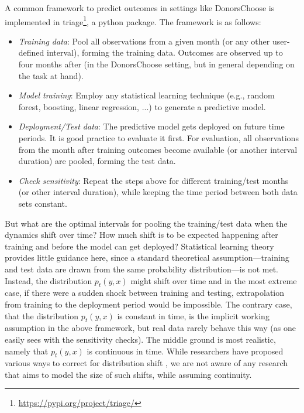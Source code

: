 \documentclass{article}
\begin{document}
A common framework to predict outcomes in settings like DonorsChoose is implemented in triage\footnote{\url{https://pypi.org/project/triage/}}, a python package. The framework is as follows: 
\begin{itemize}
    \item \textit{Training data}: Pool all observations from a given month (or any other user-defined interval), forming the training data. Outcomes are observed up to four months after (in the DonorsChoose setting, but in general depending on the task at hand).
    \item \textit{Model training}: Employ any statistical learning technique (e.g., random forest, boosting, linear regression, ...) to generate a predictive model.
    \item \textit{Deployment/Test data}: The predictive model gets deployed on future time periods. It is good practice to evaluate it first. For evaluation, all observations from the month after training outcomes become available (or another interval duration) are pooled, forming the test data.
    \item \textit{Check sensitivity}: Repeat the steps above for different training/test months (or other interval duration), while keeping the time period between both data sets constant.
\end{itemize}
But what are the optimal intervals for pooling the training/test data when the dynamics shift over time? How much shift is to be expected happening after training and before the model can get deployed? Statistical learning theory provides little guidance here, since a standard theoretical assumption---training and test data are drawn from the same probability distribution---is not met. Instead, the distribution $p_t(y, x)$ might shift over time and in the most extreme case, if there were a sudden shock between training and testing, extrapolation from training to the deployment period would be impossible. The contrary case, that the distribution $p_t(y, x)$ is constant in time, is the implicit working assumption in the above framework, but real data rarely behave this way (as one easily sees with the sensitivity checks). The middle ground is most realistic, namely that $p_t(y, x)$ is continuous in time. While researchers have proposed various ways to correct for distribution shift \citep[e.g.,][p. 133ff.]{varshney_trustworthy_2021}, we are not aware of any research that aims to model the size of such shifts, while assuming continuity.
\end{document}
